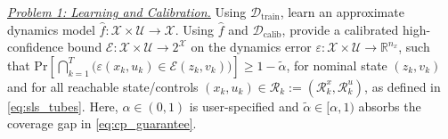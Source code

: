 \documentclass{l4dc2026}
\newcommand{\calib}{\mathcal{D}_{\mathrm{calib}}}
\begin{document}
\noindent\textit{\underline{Problem 1: Learning and Calibration.}} Using $\mathcal{D}_\textrm{train}$, learn an approximate dynamics model $\hat f: \mathcal{X} \times \mathcal{U} \rightarrow \mathcal{X}$. Using $\hat f$ and $\calib$, provide a calibrated high-confidence bound $\mathcal{E}: \mathcal{X} \times \mathcal{U} \rightarrow 2^\mathcal{X}$ on the dynamics error $\varepsilon: \mathcal{X}\times \mathcal{U}\rightarrow \mathbb{R}^{n_x}$, such that $\textrm{Pr}[\bigcap_{k=1}^T \big(\varepsilon(x_k,u_k) \in \mathcal{E}(z_k,v_k)\big)] \ge 1-\tilde\alpha$, for nominal state $(z_k, v_k)$ and for all reachable state/controls $(x_k,u_k) \in \mathcal{R}_k:= (\mathcal{R}_k^x, \mathcal{R}_k^u)$, as defined in \eqref{eq:sls_tubes}. Here, $\alpha \in(0,1)$ is user-specified and $\tilde \alpha \in [\alpha, 1)$ absorbs the coverage gap in \eqref{eq:cp_guarantee}.
\end{document}
